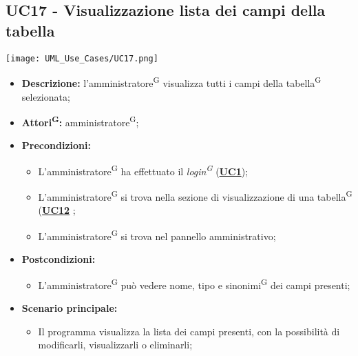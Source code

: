 \subsection{UC17 - Visualizzazione lista dei campi della tabella}
\label{sec:UC17}
\texttt{[image: UML\_Use\_Cases/UC17.png]}
\begin{itemize}
	\item \textbf{Descrizione:} l’amministratore\textsuperscript{G} visualizza tutti i campi della tabella\textsuperscript{G} selezionata;
	\item \textbf{Attori\textsuperscript{G}:} amministratore\textsuperscript{G};
	\item \textbf{Precondizioni:} 
	\begin{itemize}
		\item L’amministratore\textsuperscript{G} ha effettuato il \textit{login\textsuperscript{G}} (\hyperref[sec:UC1]{\textbf{UC1}});
		\item L’amministratore\textsuperscript{G} si trova nella sezione di visualizzazione di una tabella\textsuperscript{G} (\hyperref[sec:UC12]{\textbf{UC12}} ;
		\item L’amministratore\textsuperscript{G} si trova nel pannello amministrativo;
	\end{itemize}
	\item \textbf{Postcondizioni:} 
	\begin{itemize}
		\item L'amministratore\textsuperscript{G} può vedere nome, tipo e sinonimi\textsuperscript{G} dei campi presenti;
	\end{itemize}
	\item \textbf{Scenario principale:} 
	\begin{itemize}
		\item Il programma visualizza la lista dei campi presenti, con la possibilità di modificarli, visualizzarli o eliminarli;
	\end{itemize}
\end{itemize}

